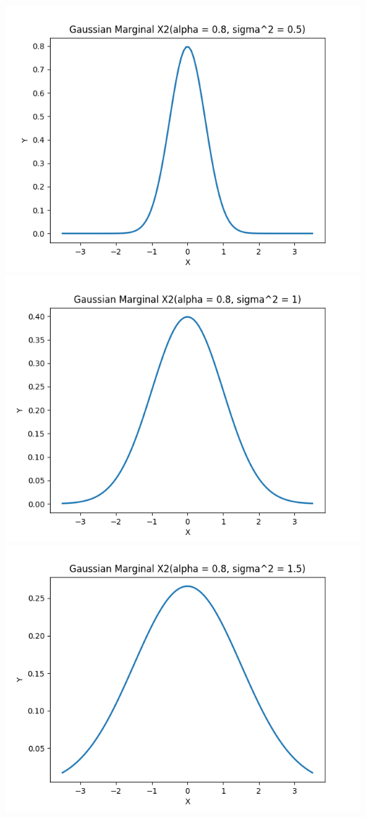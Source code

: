 \documentclass{article}
\begin{document}
\includegraphics[width=\linewidth]{X2(alpha = 0.8, sigma^2 = 0.5).png}
\includegraphics[width=\linewidth]{X2(alpha = 0.8, sigma^2 = 1).png}
\includegraphics[width=\linewidth]{X2(alpha = 0.8, sigma^2 = 1.5).png}
\end{document}
